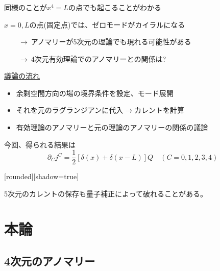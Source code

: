 \documentclass[
  unicode,a4paper,9pt,
  xcolor = {dvipsnames,svgnames},
  hyperref ={colorlinks=true,citecolor=Navy,linkcolor=NavyBlue,urlcolor=purple},
  ja=standard,lualatex
]{beamer}
\begin{document}
\begin{frame}
  \frametitle{\subsecname}

  同様のことが$x^{4}=L$の点でも起こることがわかる

  \vspace*{5pt}

  $x=0,L$の点(固定点)では、ゼロモードがカイラルになる

  $\qquad\rightarrow\ $アノマリーが5次元の理論でも現れる可能性がある

  $\qquad\rightarrow\ $4次元有効理論でのアノマリーとの関係は?

  \pause
  \vspace*{5pt}

  \uline{議論の流れ}

  \begin{itemize}
    \item 
    余剰空間方向の場の境界条件を設定、モード展開
    \item 
    それを元のラグランジアンに代入$\rightarrow$カレントを計算
    \item 
    有効理論のアノマリーと元の理論のアノマリーの関係の議論
  \end{itemize}

  \vspace*{5pt}

  今回、得られる結果は
  \begin{equation*}
    \partial_{C}j^{C}
    =
    \frac{1}{2}\left[ \delta(x)+\delta(x-L) \right]Q
    \quad
    (C=0,1,2,3,4)
  \end{equation*}

  [rounded][shadow=true]
  \begin{block}{}
    \centering
    5次元のカレントの保存も量子補正によって破れることがある。
  \end{block}

\end{frame}


\section{本論}

\begin{frame}[plain]
  \huge \secname
\end{frame}

\subsection{4次元のアノマリー}
\end{document}
